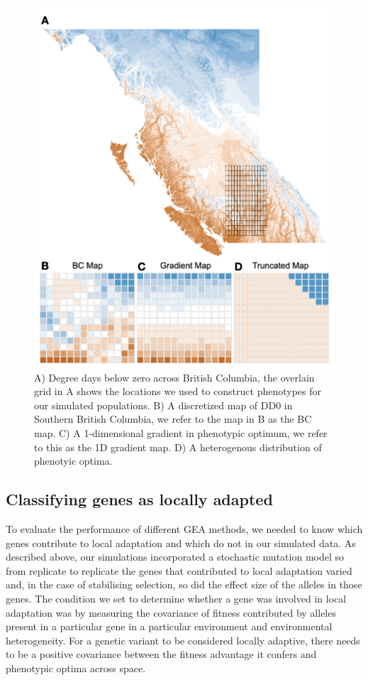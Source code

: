 \documentclass[10pt,twoside,lineno, twocolumn]{GSA_format}
\begin{document}
\begin{figure}
  \includegraphics[width=0.5\linewidth,keepaspectratio]{Plots/Figure1/Figure1}
  \caption{A) Degree days below zero across British Columbia, the overlain grid in A shows the locations we used to construct phenotypes for our simulated populations. B) A discretized map of DD0 in Southern British Columbia, we refer to the map in B as the BC map. C) A 1-dimensional gradient in phenotypic optimum, we refer to this as the 1D gradient map. D) A heterogenous distribution of phenotyic optima.}
  
  \label{fig:envGridPlot}
\end{figure}


\subsection{Classifying genes as locally adapted} 

To evaluate the performance of different GEA methods, we needed to know which genes contribute to local adaptation and which do not in our simulated data. As described above, our simulations incorporated a stochastic mutation model so from replicate to replicate the genes that contributed to local adaptation varied and, in the case of stabilising selection, so did the effect size of the alleles in those genes. The condition we set to determine whether a gene was involved in local adaptation was by measuring the covariance of fitness contributed by alleles present in a particular gene in a particular environment and environmental heterogeneity. For a genetic variant to be considered locally adaptive, there needs to be a positive covariance between the fitness advantage it confers and phenotypic optima across space. \\
\end{document}
